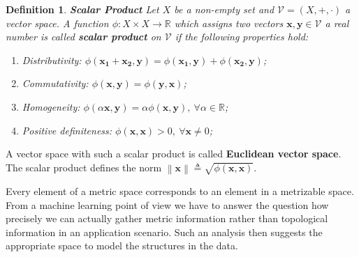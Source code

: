 \documentclass[twoside]{article}
\newcommand{\norm}[1]{\left\lVert #1 \right\rVert}
\newtheorem{definition}[theorem]{Definition}
\begin{document}
\begin{definition} \textbf{Scalar Product}
Let $X$ be a non-empty set and $\mathcal{V} = (X,+,\cdot)$ a vector space. A function $\phi : X \times X \rightarrow \mathbb{R}$ which assigns two vectors $\boldsymbol{x}, \boldsymbol{y} \in \mathcal{V}$ a real number is called \textbf{scalar product} on $\mathcal{V}$ if the following properties hold:
\renewcommand{\theenumi}{\Roman{enumi}}
\begin{enumerate}
    \item Distributivity: $\phi(\boldsymbol{x_1} + \boldsymbol{x_2}, \boldsymbol{y}) = \phi(\boldsymbol{x_1}, \boldsymbol{y}) + \phi(\boldsymbol{x_2}, \boldsymbol{y})$;
    \item Commutativity: $\phi(\boldsymbol{x}, \boldsymbol{y}) = \phi(\boldsymbol{y}, \boldsymbol{x})$;
    \item Homogeneity: $\phi(\alpha\boldsymbol{x}, \boldsymbol{y}) = \alpha\phi(\boldsymbol{x}, \boldsymbol{y}), \: \forall \alpha \in \mathbb{R}$;
    \item Positive definiteness: $\phi(\boldsymbol{x}, \boldsymbol{x}) > 0, \: \forall \boldsymbol{x} \neq 0$;
\end{enumerate}
\end{definition}
A vector space with such a scalar product is called \textbf{Euclidean vector space}. The scalar product defines the norm $\norm{\boldsymbol{x}} \triangleq \sqrt{\phi(\boldsymbol{x},\boldsymbol{x})}$.\medskip

Every element of a metric space corresponds to an element in a metrizable space.\\
From a machine learning point of view we have to answer the question how precisely we can actually gather metric information rather than topological information in an application scenario. Such an analysis then suggests the appropriate space to model the structures in the data.
\end{document}
